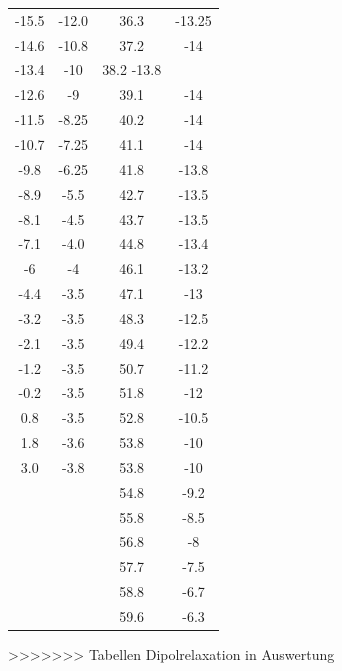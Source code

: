 \begin{table}[H]
\begin{tabular}{c|c|c|c}
    -15.5& -12.0&36.3& -13.25\\
    -14.6& -10.8&37.2& -14\\
    -13.4& -10&38.2 -13.8\\
    -12.6& -9&39.1& -14\\
    -11.5& -8.25&40.2& -14\\
    -10.7& -7.25&41.1& -14\\
    -9.8& -6.25&41.8& -13.8\\
    -8.9& -5.5&42.7& -13.5\\
    -8.1& -4.5&43.7& -13.5\\
    -7.1& -4.0&44.8& -13.4\\
    -6 &-4&46.1& -13.2\\
    -4.4& -3.5&47.1& -13\\
    -3.2 &-3.5&48.3& -12.5\\
    -2.1 &-3.5&49.4& -12.2\\
    -1.2 &-3.5&50.7& -11.2\\
    -0.2 &-3.5&51.8& -12\\
    0.8 &-3.5&52.8& -10.5\\
    1.8 &-3.6&53.8& -10\\
    3.0 &-3.8&53.8& -10\\
    &&54.8& -9.2\\
    &&55.8& -8.5\\
  &&  56.8& -8\\
  &&  57.7& -7.5\\
  &&  58.8& -6.7\\
  &&  59.6& -6.3\\

  \end{tabular}
\end{table}
>>>>>>> Tabellen Dipolrelaxation in Auswertung
